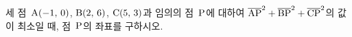 세 점~$\mathrm{A}(-1,\mkern3mu 0)$, $\mathrm{B}(2,\mkern3mu 6)$, $\mathrm{C}(5,\mkern3mu 3)$과 임의의 점~$\mathrm{P}$에 대하여 $\overline{\mathrm{AP}}^2+\overline{\mathrm{BP}}^2+\overline{\mathrm{CP}}^2$의 값이 최소일 때, 점~$\mathrm{P}$의 좌표를 구하시오.
